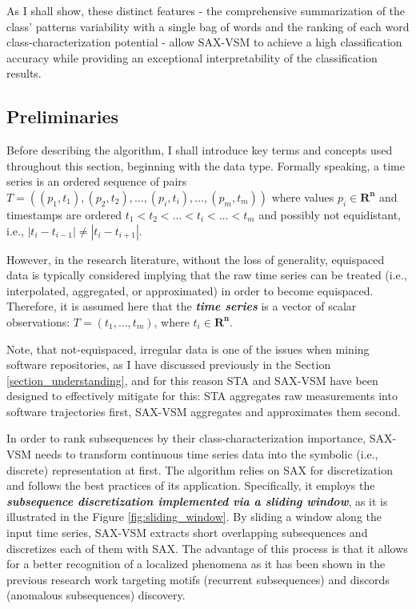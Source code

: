 As I shall show, these distinct features - the comprehensive summarization of the class' patterns variability with a single bag 
of words and the ranking of each word class-characterization potential - allow SAX-VSM to achieve a high classification accuracy
while providing an exceptional interpretability of the classification results.

\subsection{Preliminaries}
Before describing the algorithm, I shall introduce key terms and concepts used throughout this section, beginning with the data type.
Formally speaking, a time series is an ordered sequence of pairs 
\mbox{$T=((p_{1},t_{1}),(p_{2},t_{2}),...,(p_{i},t_{i}),...,(p_{m},t_{m}))$}
where values $p_{i} \in \mathbf{R^{n}}$ and timestamps are ordered $t_{1} < t_{2} < ... < t_{i} <...<t_{m}$ 
and possibly not equidistant, i.e., $|t_{i}-t_{i-1}| \neq |t_{i}-t_{i+1}|$.

However, in the research literature, without the loss of generality, equispaced data is typically considered implying 
that the raw time series can be treated (i.e., interpolated, aggregated, or approximated) in order to become equispaced. 
Therefore, it is assumed here that the \textbf{\textit{time series}} is a vector of scalar observations: 
$T = ( t_{1},\dots,t_{m} )$, where $t_{i} \in \mathbf{R^{n}}$.

Note, that not-equispaced, irregular data is one of the issues when mining software repositories, as I have discussed previously in 
the Section \ref{section_understanding}, and for this reason STA and SAX-VSM have been designed to effectively mitigate for this: 
STA aggregates raw measurements into software trajectories first, SAX-VSM aggregates and approximates them second. 

In order to rank subsequences by their class-characterization importance, SAX-VSM needs to transform continuous time series data 
into the symbolic (i.e., discrete) representation at first. The algorithm relies on SAX \cite{citeulike:2821475} for discretization and follows 
the best practices of its application. Specifically, it employs the \textit{\textbf{subsequence discretization implemented via a sliding window}}, 
as it is illustrated in the Figure \ref{fig:sliding_window}. By sliding a window along the input time series, SAX-VSM extracts short 
overlapping subsequences and discretizes each of them with SAX. The advantage of this process is that it allows for a better recognition of 
a localized phenomena as it has been shown in the previous research work targeting motifs (recurrent subsequences) \cite{citeulike:3977965} 
and discords (anomalous subsequences) \cite{citeulike:3175749} discovery. 

